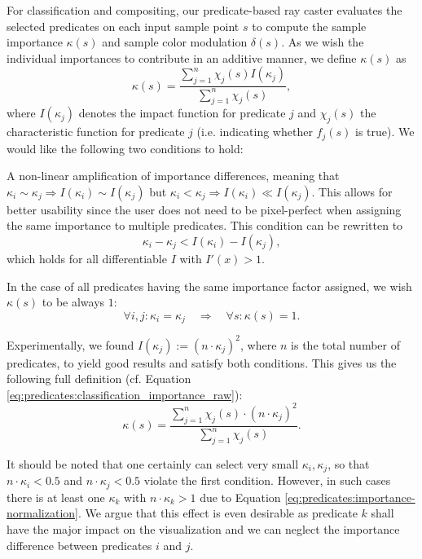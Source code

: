 For classification and compositing, our predicate-based ray caster evaluates the selected predicates on each input sample point $s$ to compute the sample importance $\kappa(s)$ and sample color modulation $\delta(s)$. 
As we wish the individual importances to contribute in an additive manner, we define $\kappa(s)$ as
\begin{equation}
	\label{eq:predicates:classification_importance_raw}
	\kappa(s) = \frac{\sum^n_{j=1} \chi_j(s) I(\kappa_j)}{\sum^n_{j=1} \chi_j(s)},
\end{equation}
where $I(\kappa_j)$ denotes the impact function for predicate $j$ and $\chi_j(s)$ the characteristic function for predicate $j$ (i.e. indicating whether $f_j(s)$ is true).
We would like the following two conditions to hold:
\begin{my_list_num}
	\item 
		A non-linear amplification of importance differences, meaning that $\kappa_i \sim \kappa_j \Rightarrow I(\kappa_i) \sim I(\kappa_j)$ but $\kappa_i < \kappa_j \Rightarrow I(\kappa_i) \ll I(\kappa_j)$.
		This allows for better usability since the user does not need to be pixel-perfect when assigning the same importance to multiple predicates. 
		This condition can be rewritten to 
		\begin{equation}
			\kappa_i - \kappa_j <  I(\kappa_i) - I(\kappa_j), 
		\end{equation}
		which holds for all differentiable $I$ with $I'(x) > 1$.
	
	\item
		In the case of all predicates having the same importance factor assigned, we wish $\kappa(s)$ to be always $1$:
		\begin{equation}
			\forall i,j : \kappa_i = \kappa_j   \quad \Rightarrow \quad   \forall s : \kappa(s) = 1.
		\end{equation}
\end{my_list_num}

Experimentally, we found $I(\kappa_j) := (n \cdot \kappa_j)^2$, where $n$ is the total number of predicates, to yield good results and satisfy both conditions. This gives us the following full definition (cf. Equation \eqref{eq:predicates:classification_importance_raw}):
\begin{equation}
	\kappa(s) = \frac{\sum^n_{j=1} \chi_j(s) \cdot (n \cdot \kappa_j)^2}{\sum^n_{j=1} \chi_j(s)}.
	\label{eq:predicates:classification_importance}
\end{equation}

It should be noted that one certainly can select very small $\kappa_i, \kappa_j$, so that $n \cdot \kappa_i < 0.5$ and $n \cdot \kappa_j < 0.5$ violate the first condition. However, in such cases there is at least one $\kappa_k$ with $n \cdot \kappa_k > 1$ due to Equation \eqref{eq:predicates:importance-normalization}. We argue that this effect is even desirable as predicate $k$ shall have the major impact on the visualization and we can neglect the importance difference between predicates $i$ and $j$.

